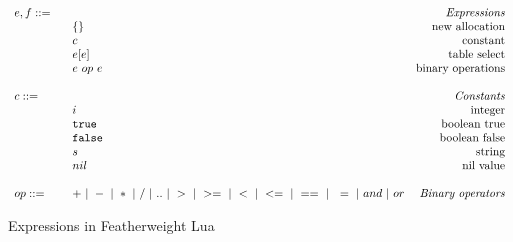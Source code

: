 \documentclass{article}
\newcommand{\rel}[1]{ \mbox{\sc [#1]} }
\begin{document}
\begin{figure}
\caption{Expressions in Featherweight Lua}
\label{fig:FWLuaExp}
\[
\begin{array}{llr}
  \mydefhead{e,f ::=\qquad\qquad\qquad\qquad}{Expressions}
  \mydefcase{\{\}}{new allocation}
  \mydefcase{c}{constant}
  \mydefcase{e[e]}{table select}
  \mydefcase{e ~op~ e}{binary operations}
  \\
  \mydefhead{c ::=\qquad\qquad\qquad\qquad}{Constants}
  \mydefcase{i}{integer}
  \mydefcase{\tt true}{boolean true}
  \mydefcase{\tt false}{boolean false}
  \mydefcase{s}{string}
  \mydefcase{nil}{nil value}
  \\
  op ::= & + ~|~ - ~|~ * ~|~ / ~|~ .. ~|~ > ~|~ >= ~|~ < ~|~ <= ~|~ == ~|~ ~= ~|~ and ~|~ or & \mbox{\emph{Binary operators}} \\
\end{array}
\]
\end{figure}


\newcommand{\ssrule}[3]{
  \rel{#1} &
  \frac{\strut\begin{array}{@{}c@{}} #2 \end{array}}
       {\strut\begin{array}{@{}c@{}} #3 \end{array}}
   \\~\\
}
\newcommand{\semanticExp}[3]{{#1},{#2} \downarrow {#3}}
\newcommand{\semanticExpRaw}[3]{{#1},{#2} \downarrow {#3}}
\newcommand{\ctxt}{C}
\newcommand{\true}{\mbox{\tt true}}
\newcommand{\false}{\mbox{\tt false}}
\end{document}
